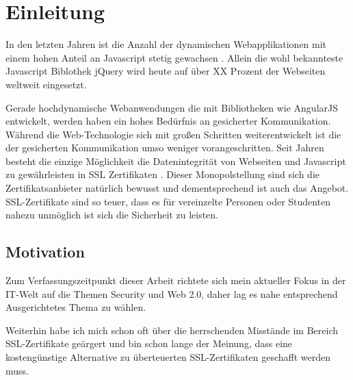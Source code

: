 
\section{Einleitung}





In den letzten Jahren ist die Anzahl der dynamischen Webapplikationen mit einem hohen Anteil an Javascript stetig gewachsen \quelle.
Allein die wohl bekannteste Javascript Biblothek jQuery \urlref wird heute auf über XX Prozent der Webseiten weltweit eingesetzt. \quelle

Gerade hochdynamische Webanwendungen die mit Bibliotheken wie AngularJS \urlref entwickelt, werden haben ein hohes Bedürfnis an gesicherter Kommunikation.
Während die Web-Technologie sich mit großen Schritten weiterentwickelt ist die der gesicherten Kommunikation umso weniger vorangeschritten.
Seit Jahren besteht die einzige Möglichkeit die Datenintegrität von Webseiten und Javascript zu gewährleisten in SSL Zertifikaten .
Dieser Monopolstellung sind sich die Zertifikatsanbieter natürlich bewusst und dementsprechend ist auch das Angebot.
SSL-Zertifikate sind so teuer, dass es für vereinzelte Personen oder Studenten nahezu unmöglich ist sich die Sicherheit zu leisten.


\subsection{Motivation}
Zum Verfassungszeitpunkt dieser Arbeit richtete sich mein aktueller Fokus in der IT-Welt auf die Themen Security und Web 2.0, daher lag es nahe entsprechend Ausgerichtetes Thema zu wählen.

Weiterhin habe ich mich schon oft über die herrschenden Misstände im Bereich SSL-Zertifikate geärgert und bin schon lange der Meinung, dass eine kostengünstige Alternative zu überteuerten SSL-Zertifikaten geschafft werden muss.


